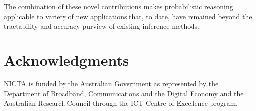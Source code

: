 \documentclass[letterpaper]{article}
\begin{document}
 The combination of these novel contributions 
makes probabilistic reasoning applicable to variety of new applications
that, to date, have remained beyond the tractability and accuracy
purview of existing inference methods.

\section{Acknowledgments}
NICTA is funded by the Australian Government as represented by
the Department of Broadband, Communications and the Digital
Economy and the Australian Research Council through the ICT
Centre of Excellence program.

\small



\end{document}
